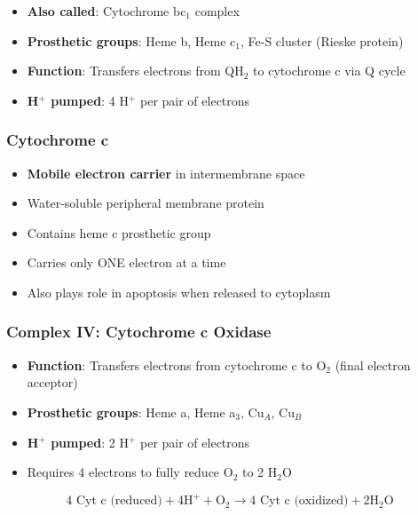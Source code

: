 \begin{itemize}
    \item \textbf{Also called}: Cytochrome bc$_1$ complex
    \item \textbf{Prosthetic groups}: Heme b, Heme c$_1$, Fe-S cluster (Rieske protein)
    \item \textbf{Function}: Transfers electrons from QH$_2$ to cytochrome c via Q cycle
    \item \textbf{H$^+$ pumped}: 4 H$^+$ per pair of electrons
\end{itemize}

\subsubsection{Cytochrome c}

\begin{itemize}
    \item \textbf{Mobile electron carrier} in intermembrane space
    \item Water-soluble peripheral membrane protein
    \item Contains heme c prosthetic group
    \item Carries only ONE electron at a time
    \item Also plays role in apoptosis when released to cytoplasm
\end{itemize}

\subsubsection{Complex IV: Cytochrome c Oxidase}

\begin{itemize}
    \item \textbf{Function}: Transfers electrons from cytochrome c to O$_2$ (final electron acceptor)
    \item \textbf{Prosthetic groups}: Heme a, Heme a$_3$, Cu$_A$, Cu$_B$
    \item \textbf{H$^+$ pumped}: 2 H$^+$ per pair of electrons
    \item Requires 4 electrons to fully reduce O$_2$ to 2 H$_2$O
\end{itemize}

\[
4 \text{ Cyt c (reduced)} + 4\text{H}^+ + \text{O}_2 \rightarrow 4 \text{ Cyt c (oxidized)} + 2\text{H}_2\text{O}
\]

